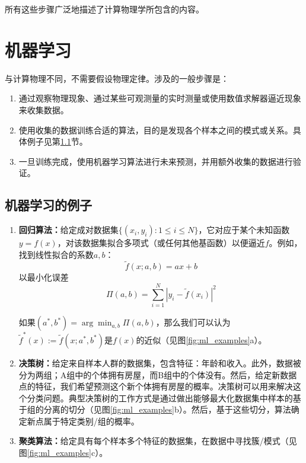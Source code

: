 所有这些步骤广泛地描述了计算物理学所包含的内容。

\section{机器学习}
\label{sec:machine_learning}

与计算物理不同，不需要假设物理定律。涉及的一般步骤是：

\begin{enumerate}
\item 通过观察物理现象、通过某些可观测量的实时测量或使用数值求解器逼近现象来收集数据。

\item 使用收集的数据训练合适的算法，目的是发现各个样本之间的模式或关系。具体例子见第\ref{subsec:ml_examples}节。

\item 一旦训练完成，使用机器学习算法进行未来预测，并用额外收集的数据进行验证。
\end{enumerate}

\subsection{机器学习的例子}
\label{subsec:ml_examples}

\begin{enumerate}
\item \textbf{回归算法：}给定成对数据集$\{(x_i, y_i) : 1 \leq i \leq N\}$，它对应于某个未知函数$y = f(x)$，对该数据集拟合多项式（或任何其他基函数）以便逼近$f$。例如，找到线性拟合的系数$a, b$：
\begin{equation}
\tilde{f}(x; a, b) = ax + b
\end{equation}
以最小化误差
\begin{equation}
\Pi(a, b) = \sum_{i=1}^{N} |y_i - \tilde{f}(x_i)|^2
\label{eq:regression_error}
\end{equation}

如果$(a^*, b^*) = \arg\min_{a,b} \Pi(a, b)$，那么我们可以认为$\tilde{f}^*(x) := \tilde{f}(x; a^*, b^*)$是$f(x)$的近似（见图\ref{fig:ml_examples}a）。

\item \textbf{决策树：}给定来自样本人群的数据集，包含特征：年龄和收入。此外，数据被分为两组；A组中的个体拥有房屋，而B组中的个体没有。然后，给定新数据点的特征，我们希望预测这个新个体拥有房屋的概率。决策树可以用来解决这个分类问题。典型决策树的工作方式是通过做出能够最大化数据集中样本的基于组的分离的切分（见图\ref{fig:ml_examples}b）。然后，基于这些切分，算法确定新点属于特定类别/组的概率。

\item \textbf{聚类算法：}给定具有每个样本多个特征的数据集，在数据中寻找簇/模式（见图\ref{fig:ml_examples}c）。
\end{enumerate}

